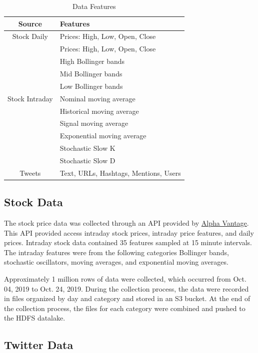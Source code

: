\documentclass[journal]{IEEEtran}
\begin{document}
\begin{table}
	\renewcommand{\arraystretch}{1.3}
	\caption{Data Features}
	\label{DataFeatures}
	\centering
	\begin{tabular}{c|l}
		\hline
		Source       & Features\\
		\hline
		\hline
		Stock Daily  & Prices: High, Low, Open, Close\\
		\hline
		\multirow{9}{*}{Stock Intraday} &  Prices: High, Low, Open, Close \\
		&  High Bollinger bands\\
		&  Mid Bollinger bands\\
		&  Low Bollinger bands\\ 
		&  Nominal moving average\\
		&  Historical moving average\\
		&  Signal moving average\\ 
		&  Exponential moving average\\
		&  Stochastic Slow K\\
		&  Stochastic Slow D\\
		\hline
		Tweets       & Text, URLs, Hashtags, Mentions, Users\\
		\hline
	\end{tabular}
\end{table}

\subsection{Stock Data}

The stock price data was collected through an API provided by \href{https://www.alphavantage.co/}{Alpha Vantage}.
This API provided access intraday stock prices, intraday price features, and daily prices.
Intraday stock data contained 35 features sampled at 15 minute intervals. 
The intraday features were from the following categories Bollinger bands, stochastic oscillators, moving averages, and exponential moving averages.

Approximately 1 million rows of data were collected,
which occurred from Oct. 04, 2019 to Oct. 24, 2019.
During the collection process, the data were recorded in files
 organized by day and category and stored in an S3 bucket.
At the end of the collection process, the files for each
 category were combined and pushed to the HDFS datalake.

\subsection{Twitter Data}
\end{document}
